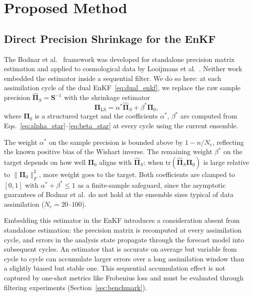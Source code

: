 \section{Proposed Method}
\label{sec:method}

\subsection{Direct Precision Shrinkage for the EnKF}
\label{sec:dps_enkf}

The Bodnar et al.~\cite{bodnar2016direct} framework was developed for standalone precision matrix estimation and applied to cosmological data by Looijmans et al.~\cite{looijmans2024comparison}. Neither work embedded the estimator inside a sequential filter. We do so here: at each assimilation cycle of the dual EnKF~\eqref{eq:dual_enkf}, we replace the raw sample precision $\hat{\boldsymbol{\Pi}}_S = \mathbf{S}^{-1}$ with the shrinkage estimator
\begin{equation}
\label{eq:direct_precision_method}
\boldsymbol{\Pi}_{\text{LS}} = \alpha^* \hat{\boldsymbol{\Pi}}_S + \beta^* \boldsymbol{\Pi}_0,
\end{equation}
where $\boldsymbol{\Pi}_0$ is a structured target and the coefficients $\alpha^*$, $\beta^*$ are computed from Eqs.~\eqref{eq:alpha_star}--\eqref{eq:beta_star} at every cycle using the current ensemble.

The weight $\alpha^*$ on the sample precision is bounded above by $1 - n/N_e$, reflecting the known positive bias of the Wishart inverse. The remaining weight $\beta^*$ on the target depends on how well $\boldsymbol{\Pi}_0$ aligns with $\hat{\boldsymbol{\Pi}}_S$: when $\text{tr}(\hat{\boldsymbol{\Pi}}_S \boldsymbol{\Pi}_0)$ is large relative to $\|\boldsymbol{\Pi}_0\|_F^2$, more weight goes to the target. Both coefficients are clamped to $[0, 1]$ with $\alpha^* + \beta^* \leq 1$ as a finite-sample safeguard, since the asymptotic guarantees of Bodnar et al.\ do not hold at the ensemble sizes typical of data assimilation ($N_e = 20$--$100$).

Embedding this estimator in the EnKF introduces a consideration absent from standalone estimation: the precision matrix is recomputed at every assimilation cycle, and errors in the analysis state propagate through the forecast model into subsequent cycles. An estimator that is accurate on average but variable from cycle to cycle can accumulate larger errors over a long assimilation window than a slightly biased but stable one. This sequential accumulation effect is not captured by one-shot metrics like Frobenius loss and must be evaluated through filtering experiments (Section~\ref{sec:benchmark}).

